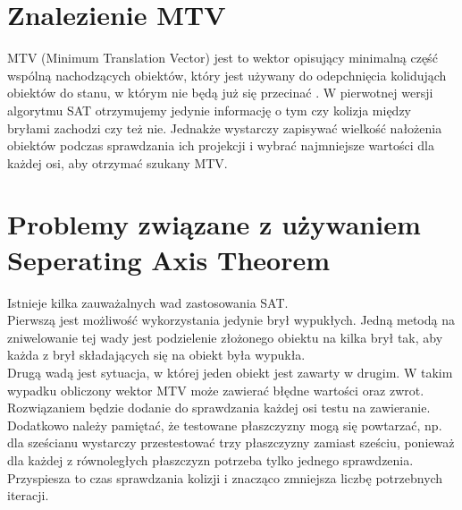 \section{Znalezienie MTV}
MTV (Minimum Translation Vector) jest to wektor opisujący minimalną część wspólną nachodzących obiektów, który jest używany do odepchnięcia kolidująch obiektów do stanu, w którym nie będą już się przecinać \cite{SAT}. W pierwotnej wersji algorytmu SAT otrzymujemy jedynie informację o tym czy kolizja między bryłami zachodzi czy też nie. Jednakże wystarczy zapisywać wielkość nałożenia obiektów podczas sprawdzania ich projekcji i wybrać najmniejsze wartości dla każdej osi, aby otrzymać szukany MTV.

\section{Problemy związane z używaniem Seperating Axis Theorem}
Istnieje kilka zauważalnych wad zastosowania SAT. \\
Pierwszą jest możliwość wykorzystania jedynie brył wypukłych. Jedną metodą na zniwelowanie tej wady jest podzielenie złożonego obiektu na kilka brył tak, aby każda z brył składających się na obiekt była wypukła.\\
Drugą wadą jest sytuacja, w której jeden obiekt jest zawarty w drugim. W takim wypadku obliczony wektor MTV może zawierać błędne wartości oraz zwrot. Rozwiązaniem będzie dodanie do sprawdzania każdej osi testu na zawieranie. \\
Dodatkowo należy pamiętać, że testowane płaszczyzny mogą się powtarzać, np. dla sześcianu wystarczy przestestować trzy płaszczyzny zamiast sześciu, ponieważ dla każdej z równoległych płaszczyzn potrzeba tylko jednego sprawdzenia. Przyspiesza to czas sprawdzania kolizji i znacząco zmniejsza liczbę potrzebnych iteracji.
